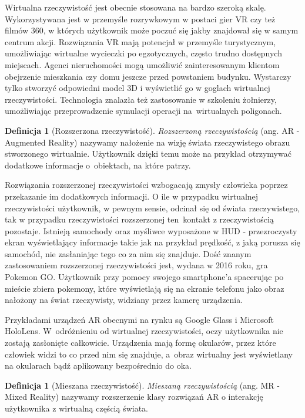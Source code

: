 \documentclass[a4paper,11pt,twoside]{report}
\theoremstyle{definition}
\newtheorem{definition}[theorem]{Definicja}
\begin{document}
Wirtualna rzeczywistość jest obecnie stosowana na bardzo szeroką skalę. Wykorzystywana jest w przemyśle rozrywkowym w postaci gier VR czy też filmów 360\textdegree, w których użytkownik może poczuć się jakby znajdował się w samym centrum akcji. Rozwiązania VR mają potencjał w przemyśle turystycznym, umożliwiając wirtualne wycieczki po egzotycznych, często trudno dostępnych miejscach. Agenci nieruchomości mogą umożliwić zainteresowanym klientom obejrzenie mieszkania czy domu jeszcze przed powstaniem budynku. Wystarczy tylko stworzyć odpowiedni model 3D i wyświetlić go w goglach wirtualnej rzeczywistości. Technologia znalazła też zastosowanie w szkoleniu żołnierzy, umożliwiając przeprowadzenie symulacji operacji na~wirtualnych poligonach.\cite{VRdefinition}

\begin{definition}[Rozszerzona rzeczywistość]
\textit{Rozszerzoną rzeczywistością} (ang. AR - Augmented Reality) nazywamy nałożenie na wizję świata rzeczywistego obrazu stworzonego wirtualnie. Użytkownik dzięki temu może na przykład otrzymywać dodatkowe informacje o~obiektach, na które patrzy.
\end{definition}

Rozwiązania rozszerzonej rzeczywistości wzbogacają zmysły człowieka poprzez przekazanie im dodatkowych informacji. O ile w przypadku wirtualnej rzeczywistości użytkownik, w pewnym sensie, odcinał się od świata rzeczywistego, tak w przypadku rzeczywistości rozszerzonej ten~kontakt z rzeczywistością pozostaje. Istnieją samochody oraz myśliwce wyposażone w HUD - przezroczysty ekran wyświetlający informacje takie jak na przykład prędkość, z jaką porusza się samochód, nie zasłaniając tego co za nim się znajduje. Dość znanym zastosowaniem rozszerzonej rzeczywistości jest, wydana w 2016 roku, gra Pokemon GO. Użytkownik przy pomocy swojego smartphone'a spacerując po mieście zbiera pokemony, które wyświetlają się na ekranie telefonu jako obraz nałożony na  świat rzeczywisty, widziany przez kamerę urządzenia.

Przykładami urządzeń AR obecnymi na rynku są Google Glass i Microsoft HoloLens. W~odróżnieniu od wirtualnej rzeczywistości, oczy użytkownika nie zostają zasłonięte całkowicie. Urządzenia mają formę okularów, przez które człowiek widzi to co przed nim się znajduje, a~obraz wirtualny jest wyświetlany na okularach bądź aplikowany bezpośrednio do oka.

\begin{definition}[Mieszana rzeczywistość]
\textit{Mieszaną rzeczywistością} (ang. MR - Mixed Reality) nazywamy rozszerzenie klasy rozwiązań AR o interakcję użytkownika z wirtualną częścią świata.
\end{definition}
\end{document}
